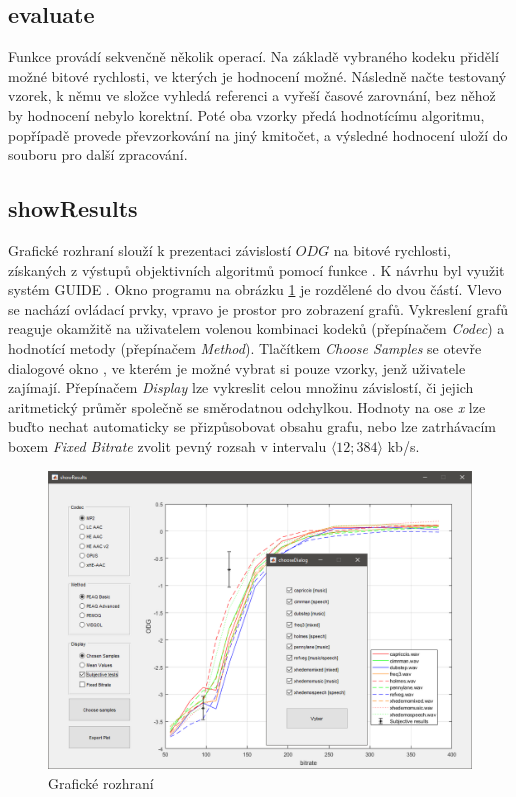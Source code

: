 \subsection{evaluate}

Funkce  provádí sekvenčně několik operací. Na základě vybraného kodeku přidělí možné bitové rychlosti, ve kterých je hodnocení možné. Následně načte testovaný vzorek, k němu ve složce  vyhledá referenci a vyřeší časové zarovnání, bez něhož by hodnocení nebylo korektní. Poté oba vzorky předá hodnotícímu algoritmu, popřípadě provede převzorkování na jiný kmitočet, a výsledné hodnocení uloží do souboru pro další zpracování.

\subsection{showResults}

Grafické rozhraní  slouží k prezentaci závislostí $ODG$ na bitové rychlosti, získaných z výstupů objektivních algoritmů pomocí funkce . K návrhu byl využit systém GUIDE \cite{web:guide}. Okno programu na obrázku \ref{pic:showResults} je rozdělené do dvou částí. Vlevo se nachází ovládací prvky, vpravo je prostor pro zobrazení grafů. Vykreslení grafů reaguje okamžitě na uživatelem volenou kombinaci kodeků (přepínačem \textit{Codec}) a hodnotící metody (přepínačem \textit{Method}). Tlačítkem \textit{Choose Samples} se otevře dialogové okno , ve kterém je možné vybrat si pouze vzorky, jenž uživatele zajímají. Přepínačem \textit{Display} lze vykreslit celou množinu závislostí, či jejich aritmetický průměr společně se směrodatnou odchylkou.
Hodnoty na ose \textit{x} lze buďto nechat automaticky se přizpůsobovat obsahu grafu, nebo lze zatrhávacím boxem \textit{Fixed Bitrate} zvolit pevný rozsah v intervalu $\langle12;384\rangle$ kb/s.

\begin{figure}[h]
\centering
\includegraphics[width=.85\textwidth]{pic/showResults.png}
\caption{Grafické rozhraní }
\label{pic:showResults}
\end{figure}

